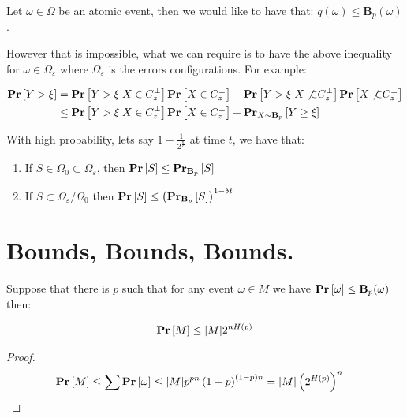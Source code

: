 \documentclass[manuscript,screen,review]{acmart}
\begin{document}
\begin{definition}
  Let $\omega \in \Omega$ be an atomic event, then we would like to have that: $q(\omega) \le \mathbf{B}_{p}(\omega)$. 
\end{definition}

However that is impossible, what we can require is to have the above inequality for $\omega \in \Omega_{\varepsilon}$ where $\Omega_{\varepsilon}$ is the errors configurations. For example: 


\begin{equation*}
  \begin{split}
  \prb{Y > \xi }&=   \prb{Y > \xi | X \in C_{z}^{\perp} } \prb{ X \in C_{z}^{\perp}} +  \prb{Y > \xi | X \not{\in} C_{z}^{\perp} } \prb{ X \not{\in} C_{z}^{\perp}} \\
  & \le \prb{Y > \xi | X \in C_{z}^{\perp} } \prb{ X \in C_{z}^{\perp}} + \prbm{ Y \ge \xi  }{ X \sim \mathbf{B}_{p}  } 
  \end{split}
\end{equation*}



With high probability, lets say $1 - \frac{1}{2^{\frac{n}{t}}}$ at time $t$, we have that:
\begin{enumerate}
  \item If $S \in  \Omega_{0} \subset \Omega_{\varepsilon} $, then $\prb{S} \le \prbm{S}{\mathbf{B}_{p}}$
  \item If $S \subset \Omega_{\varepsilon} / \Omega_{0}$ then   $\prb{S} \le \left(\prbm{S}{\mathbf{B}_{p}}\right)^{1-\delta t}$  %
\end{enumerate}

\section{Bounds, Bounds, Bounds.}

\begin{claim}
  Suppose that there is $p$ such that for any event $\omega \in M$ we have $\prb{\omega} \le \mathbf{B}_{p}(\omega)$ then: 

  \begin{equation*}
    \begin{split}
      \prb{M} \le |M| 2^{nH(p)}
    \end{split}
  \end{equation*}

\end{claim}
\begin{proof}

  \begin{equation*}
    \begin{split}
      \prb{M} & \le \sum \prb{\omega} \le |M| p^{pn}\left( 1 - p \right)^{(1-p)n} = |M| \left( 2^{H(p)} \right)^{n} 
    \end{split}
  \end{equation*}
\end{proof}
\end{document}
